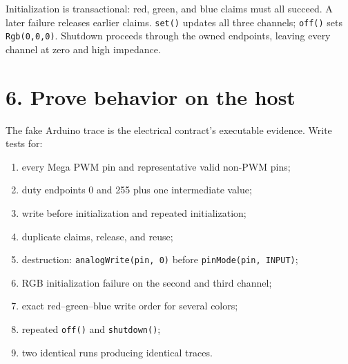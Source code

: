 \documentclass[11pt]{article}
\begin{document}
Initialization is transactional: red, green, and blue claims must all succeed.
A later failure releases earlier claims. \texttt{set()} updates all three
channels; \texttt{off()} sets \texttt{Rgb(0,0,0)}. Shutdown proceeds through
the owned endpoints, leaving every channel at zero and high impedance.

\begin{center}
\end{center}

\section*{6. Prove behavior on the host}

The fake Arduino trace is the electrical contract's executable evidence.
Write tests for:

\begin{enumerate}
    \item every Mega PWM pin and representative valid non-PWM pins;
    \item duty endpoints 0 and 255 plus one intermediate value;
    \item write before initialization and repeated initialization;
    \item duplicate claims, release, and reuse;
    \item destruction: \texttt{analogWrite(pin, 0)} before
          \texttt{pinMode(pin, INPUT)};
    \item RGB initialization failure on the second and third channel;
    \item exact red--green--blue write order for several colors;
    \item repeated \texttt{off()} and \texttt{shutdown()};
    \item two identical runs producing identical traces.
\end{enumerate}
\end{document}
